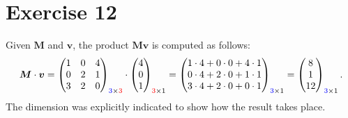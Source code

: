 \documentclass[letterpaper,11pt,twoside]{article}
\begin{document}
\section{Exercise 12}
Given $\bm{M}$ and $\bm{v}$, the product $\bm{M}\bm{v}$ is computed as follows:
\begin{align*}
  \bm{M}\cdot\bm{v}=\begin{pmatrix}
    1&0&4\\0&2&1\\3&2&0
  \end{pmatrix}_{\textcolor{blue}{3}\times\textcolor{red}{3}}\cdot\begin{pmatrix}
  4\\0\\1
  \end{pmatrix}_{\textcolor{red}{3}\times1}=\begin{pmatrix}
  1\cdot4+0\cdot0+4\cdot1\\0\cdot4+2\cdot0+1\cdot1\\3\cdot4+2\cdot0+0\cdot1
  \end{pmatrix}_{\textcolor{blue}{3}\times1}=\begin{pmatrix}
  8\\1\\12
  \end{pmatrix}_{\textcolor{blue}{3}\times1}.
\end{align*}
The dimension was explicitly indicated to show how the result takes place.
\end{document}
